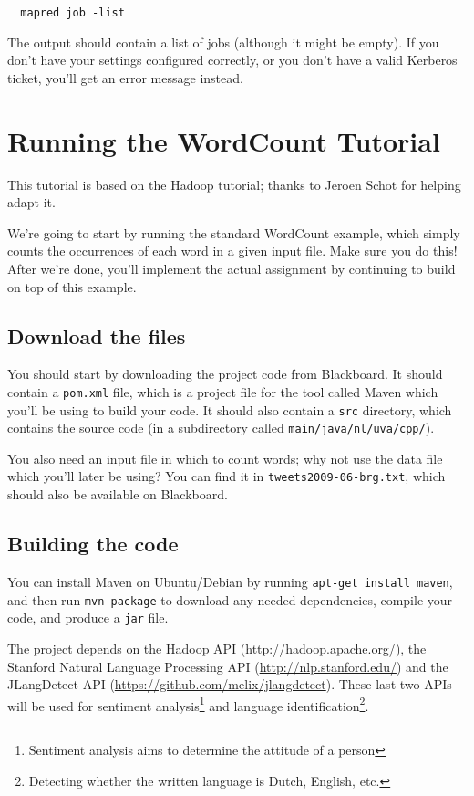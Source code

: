 \documentclass[a4paper,11pt]{article}
\begin{document}
  \begin{lstlisting}
  mapred job -list
  \end{lstlisting}

  The output should contain a list of jobs (although it might be empty). If you don't have your settings configured
  correctly, or you don't have a valid Kerberos ticket, you'll get an error message instead.

  \section{Running the WordCount Tutorial}

  This tutorial is based on the Hadoop tutorial; thanks to Jeroen Schot for helping adapt it.

  We're going to start by running the standard WordCount example, which simply counts the occurrences of each word in a given input file.
  Make sure you do this! After we're done, you'll implement the actual assignment by continuing to build on top of this example.

  \subsection{Download the files}

  You should start by downloading the project code from Blackboard. It should contain a \texttt{pom.xml} file, which is a project file for the tool
  called Maven which you'll be using to build your code. It should also contain a \texttt{src} directory, which contains the source code (in a
  subdirectory called \texttt{main/java/nl/uva/cpp/}).

  You also need an input file in which to count words; why not use the data file which you'll later be using?
  You can find it in \texttt{tweets2009-06-brg.txt}, which should also be available on Blackboard. 

  \subsection{Building the code}

  You can install Maven on Ubuntu/Debian by running \texttt{apt-get install maven}, and then run \texttt{mvn package} to download any needed
  dependencies, compile your code, and produce a \texttt{jar} file.

  The project depends on the Hadoop API (\url{http://hadoop.apache.org/}), the Stanford Natural Language Processing API (\url{http://nlp.stanford.edu/}) and the JLangDetect API (\url{https://github.com/melix/jlangdetect}). These last two APIs will be used for sentiment analysis\footnote{Sentiment analysis aims to determine the attitude of a person} and language identification\footnote{Detecting whether the written language is Dutch, English, etc. }.
\end{document}
